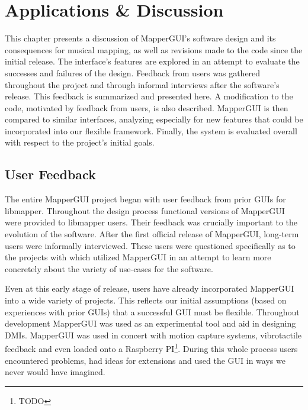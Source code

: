 \chapter{Applications \& Discussion}

This chapter presents a discussion of MapperGUI's software design and its consequences for musical mapping, as well as revisions made to the code since the initial release. The interface's features are explored in an attempt to evaluate the successes and failures of the design. Feedback from users was gathered throughout the project and through informal interviews after the software's release. This feedback is summarized and presented here. A modification to the code, motivated by feedback from users, is also described. MapperGUI is then compared to similar interfaces, analyzing especially for new features that could be incorporated into our flexible framework. Finally, the system is evaluated overall with respect to the project's initial goals.


\section{User Feedback} %
\label{sec:user_feedback}

The entire MapperGUI project began with user feedback from prior GUIs for libmapper. Throughout the design process functional versions of MapperGUI were provided to libmapper users. Their feedback was crucially important to the evolution of the software. After the first official release of MapperGUI, long-term users were informally interviewed. These users were questioned specifically as to the projects with which utilized MapperGUI in an attempt to learn more concretely about the variety of use-cases for the software.

Even at this early stage of release, users have already incorporated MapperGUI into a wide variety of projects. This reflects our initial assumptions (based on experiences with prior GUIs) that a successful GUI must be flexible. Throughout development MapperGUI was used as an experimental tool and aid in designing DMIs. MapperGUI was used in concert with motion capture systems, vibrotactile feedback and even loaded onto a Raspberry PI\footnote{TODO}. During this whole process users encountered problems, had ideas for extensions and used the GUI in ways we never would have imagined.



